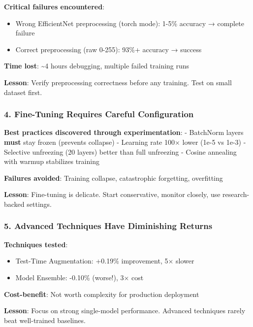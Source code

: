\documentclass[
  letterpaper,
  DIV=11,
  numbers=noendperiod]{scrartcl}
\providecommand{\tightlist}{%
  \setlength{\itemsep}{0pt}\setlength{\parskip}{0pt}}
\begin{document}
\textbf{Critical failures encountered}:

\begin{itemize}
\tightlist
\item
  Wrong EfficientNet preprocessing (torch mode): 1-5\% accuracy →
  complete failure
\item
  Correct preprocessing (raw 0-255): 93\%+ accuracy → success
\end{itemize}

\textbf{Time lost}: \textasciitilde4 hours debugging, multiple failed
training runs

\textbf{Lesson}: Verify preprocessing correctness before any training.
Test on small dataset first.

\subsubsection{4. Fine-Tuning Requires Careful
Configuration}\label{fine-tuning-requires-careful-configuration}

\textbf{Best practices discovered through experimentation}: - BatchNorm
layers \textbf{must} stay frozen (prevents collapse) - Learning rate
100× lower (1e-5 vs 1e-3) - Selective unfreezing (20 layers) better than
full unfreezing - Cosine annealing with warmup stabilizes training

\textbf{Failures avoided}: Training collapse, catastrophic forgetting,
overfitting

\textbf{Lesson}: Fine-tuning is delicate. Start conservative, monitor
closely, use research-backed settings.

\subsubsection{5. Advanced Techniques Have Diminishing
Returns}\label{advanced-techniques-have-diminishing-returns}

\textbf{Techniques tested}:

\begin{itemize}
\tightlist
\item
  Test-Time Augmentation: +0.19\% improvement, 5× slower
\item
  Model Ensemble: -0.10\% (worse!), 3× cost
\end{itemize}

\textbf{Cost-benefit}: Not worth complexity for production deployment

\textbf{Lesson}: Focus on strong single-model performance. Advanced
techniques rarely beat well-trained baselines.
\end{document}
